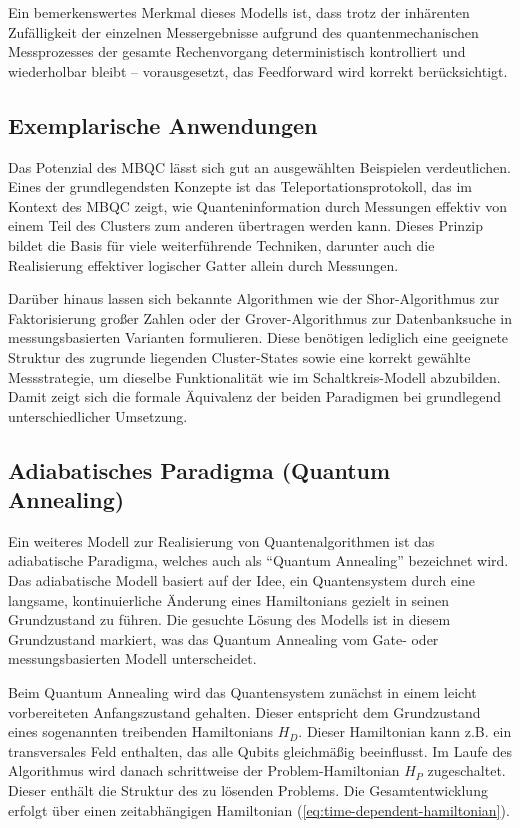 Ein bemerkenswertes Merkmal dieses Modells ist, dass trotz der inhärenten Zufälligkeit der einzelnen Messergebnisse aufgrund des quantenmechanischen Messprozesses der gesamte Rechenvorgang deterministisch kontrolliert und wiederholbar bleibt – vorausgesetzt, das Feedforward wird korrekt berücksichtigt. \autocite[3-4]{briegelMeasurementbasedQuantumComputation2009}

\subsection*{Exemplarische Anwendungen}

Das Potenzial des MBQC lässt sich gut an ausgewählten Beispielen verdeutlichen. Eines der grundlegendsten Konzepte ist das Teleportationsprotokoll, das im Kontext des MBQC zeigt, wie Quanteninformation durch Messungen effektiv von einem Teil des Clusters zum anderen übertragen werden kann. Dieses Prinzip bildet die Basis für viele weiterführende Techniken, darunter auch die Realisierung effektiver logischer Gatter allein durch Messungen.

Darüber hinaus lassen sich bekannte Algorithmen wie der Shor-Algorithmus zur Faktorisierung großer Zahlen oder der Grover-Algorithmus zur Datenbanksuche in messungsbasierten Varianten formulieren. Diese benötigen lediglich eine geeignete Struktur des zugrunde liegenden Cluster-States sowie eine korrekt gewählte Messstrategie, um dieselbe Funktionalität wie im Schaltkreis-Modell abzubilden. Damit zeigt sich die formale Äquivalenz der beiden Paradigmen bei grundlegend unterschiedlicher Umsetzung. \autocite[2]{briegelMeasurementbasedQuantumComputation2009}

\subsection{Adiabatisches Paradigma (Quantum Annealing)}

Ein weiteres Modell zur Realisierung von Quantenalgorithmen ist das adiabatische Paradigma, welches auch als \enquote{Quantum Annealing} bezeichnet wird. Das adiabatische Modell basiert auf der Idee, ein Quantensystem durch eine langsame, kontinuierliche Änderung eines Hamiltonians gezielt in seinen Grundzustand zu führen. Die gesuchte Lösung des Modells ist in diesem Grundzustand markiert, was das Quantum Annealing vom Gate- oder messungsbasierten Modell unterscheidet.

Beim Quantum Annealing wird das Quantensystem zunächst in einem leicht vorbereiteten Anfangszustand gehalten. Dieser entspricht dem Grundzustand eines sogenannten treibenden Hamiltonians $H_D$. Dieser Hamiltonian kann z.B. ein transversales Feld enthalten, das alle Qubits gleichmäßig beeinflusst. Im Laufe des Algorithmus wird danach schrittweise der Problem-Hamiltonian $H_P$ zugeschaltet. Dieser enthält die Struktur des zu lösenden Problems. Die Gesamtentwicklung erfolgt über einen zeitabhängigen Hamiltonian (\autoref{eq:time-dependent-hamiltonian}). 

